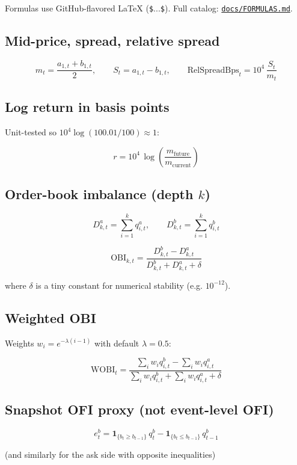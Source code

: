 \documentclass[11pt,a4paper]{article}
\begin{document}
Formulas use GitHub-flavored LaTeX (\texttt{\$$ ... $\$}). Full catalog: \href{docs/FORMULAS.md}{\texttt{docs/FORMULAS.md}}.


\subsection{Mid-price, spread, relative spread}

\[
m_t = \frac{a_{1,t} + b_{1,t}}{2}, \qquad
S_t = a_{1,t} - b_{1,t}, \qquad
\mathrm{RelSpreadBps}_t = 10^{4}\,\frac{S_t}{m_t}
\]

\subsection{Log return in basis points}

Unit-tested so $10^{4}\log(100.01/100)\approx 1$:


\[
r = 10^{4}\,\log\left(\frac{m_{\mathrm{future}}}{m_{\mathrm{current}}}\right)
\]

\subsection{Order-book imbalance (depth $k$)}

\[
D^{a}_{k,t}=\sum_{i=1}^{k} q^{a}_{i,t}, \qquad
D^{b}_{k,t}=\sum_{i=1}^{k} q^{b}_{i,t}
\]

\[
\mathrm{OBI}_{k,t}=\frac{D^{b}_{k,t}-D^{a}_{k,t}}{D^{b}_{k,t}+D^{a}_{k,t}+\delta}
\]

where $\delta$ is a tiny constant for numerical stability (e.g. $10^{-12}$).


\subsection{Weighted OBI}

Weights $w_i=e^{-\lambda(i-1)}$ with default $\lambda=0.5$:


\[
\mathrm{WOBI}_t=
\frac{\sum_{i} w_i q^{b}_{i,t}-\sum_{i} w_i q^{a}_{i,t}}
{\sum_{i} w_i q^{b}_{i,t}+\sum_{i} w_i q^{a}_{i,t}+\delta}
\]

\subsection{Snapshot OFI proxy (not event-level OFI)}

\[
e^{b}_{t}=
\mathbf{1}_{\{b_t \ge b_{t-1}\}}\,q^{b}_{t}
-
\mathbf{1}_{\{b_t \le b_{t-1}\}}\,q^{b}_{t-1}
\]

(and similarly for the ask side with opposite inequalities)
\end{document}
